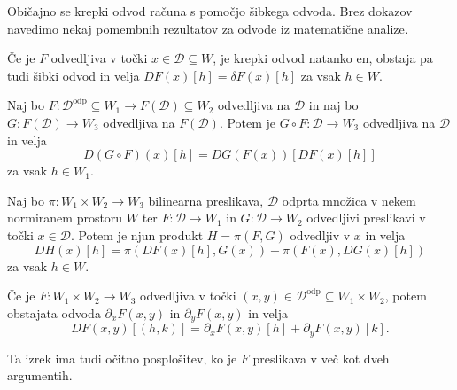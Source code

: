 Običajno se krepki odvod računa s pomočjo šibkega odvoda.
Brez dokazov navedimo nekaj pomembnih rezultatov za odvode iz matematične analize.

\begin{trditev}
	Če je $F$ odvedljiva v točki $x\in\mathcal{D}\subseteq W$, je krepki odvod natanko en,
	obstaja pa tudi šibki odvod in velja $DF(x)[h]=\delta F(x)[h]$ za vsak $h\in W$.
\end{trditev}

\begin{izrek} Naj bo $F:\mathcal{D}^{\mathrm{odp}}\subseteq W_1\rightarrow
	F(\mathcal{D})\subseteq W_2$ odvedljiva na $\mathcal{D}$ in naj bo
	$G:F(\mathcal{D})\rightarrow W_3$ odvedljiva na $F(\mathcal{D})$. Potem je $G\circ F:\mathcal{D}
	\rightarrow W_3$ odvedljiva na $\mathcal{D}$ in velja
	\begin{equation*}
		D\left(G\circ F\right)(x)[h]=DG\left(F(x)\right)\left[DF(x)[h]\right]
	\end{equation*}
	za vsak $h\in W_1$.
\end{izrek}

\begin{izrek} Naj bo $\pi:W_1 \times W_2\rightarrow W_3$ bilinearna
	preslikava, $\mathcal{D}$ odprta množica v nekem normiranem prostoru $W$ ter
	$F:\mathcal{D}\rightarrow W_1$ in $G:\mathcal{D}\rightarrow W_2$
	odvedljivi preslikavi v točki $x\in\mathcal{D}$. Potem je njun produkt $H=\pi(F,G)$
	odvedljiv v $x$ in velja
	\begin{equation*}
		DH(x)[h]=\pi\left(DF(x)[h],G(x)\right)+\pi\left(F(x),DG(x)[h]\right)
	\end{equation*}
	za vsak $h\in W$.
\end{izrek}

\begin{izrek} Če je $F:W_1\times W_2\rightarrow W_3$ odvedljiva v točki
$(x,y)\in\mathcal{D}^{\mathrm{odp}}\subseteq W_1\times W_2$,
potem obstajata odvoda $\partial_xF(x,y)$ in $\partial_yF(x,y)$ in velja
\begin{equation*}
	DF(x,y)[(h,k)]=\partial_xF(x,y)[h]+\partial_yF(x,y)[k].
\end{equation*}
\end{izrek}
Ta izrek ima tudi očitno posplošitev, ko je $F$ preslikava v več kot dveh argumentih.


